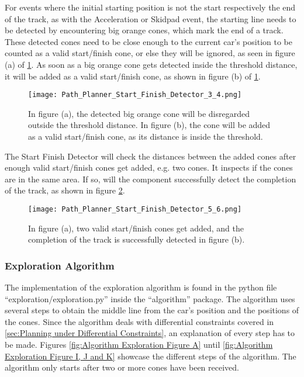 For events where the initial starting position is not the start respectively the end of the track, as with the Acceleration or Skidpad event, the starting line needs to be detected by encountering big orange cones, which mark the end of a track. These detected cones need to be close enough to the current car's position to be counted as a valid start/finish cone, or else they will be ignored, as seen in figure (a) of \ref{fig:Path Planner Start Finish Detector 3 and 4}. As soon as a big orange cone gets detected inside the threshold distance, it will be added as a valid start/finish cone, as shown in figure (b) of \ref{fig:Path Planner Start Finish Detector 3 and 4}.
\begin{figure}[H]
    \centering
    \texttt{[image: Path\_Planner\_Start\_Finish\_Detector\_3\_4.png]}
    \caption{In figure (a), the detected big orange cone will be disregarded outside the threshold distance. In figure (b), the cone will be added as a valid start/finish cone, as its distance is inside the threshold.}
    \label{fig:Path Planner Start Finish Detector 3 and 4}
\end{figure}

The Start Finish Detector will check the distances between the added cones after enough valid start/finish cones get added, e.g. two cones. It inspects if the cones are in the same area. If so, will the component successfully detect the completion of the track, as shown in figure \ref{fig:Path Planner Start Finish Detector 5 and 6}.
\begin{figure}[H]
    \centering
    \texttt{[image: Path\_Planner\_Start\_Finish\_Detector\_5\_6.png]}
    \caption{In figure (a), two valid start/finish cones get added, and the completion of the track is successfully detected in figure (b).}
    \label{fig:Path Planner Start Finish Detector 5 and 6}
\end{figure}

\subsubsection{Exploration Algorithm} \label{sec:Exploration Algorithm}
The implementation of the exploration algorithm is found in the python file ``exploration/exploration.py'' inside the ``algorithm'' package. The algorithm uses several steps to obtain the middle line from the car's position and the positions of the cones. Since the algorithm deals with differential constraints covered in \ref{sec:Planning under Differential Constraints}, an explanation of every step has to be made. Figures \ref{fig:Algorithm Exploration Figure A} until \ref{fig:Algorithm Exploration Figure I, J and K} showcase the different steps of the algorithm. The algorithm only starts after two or more cones have been received.

